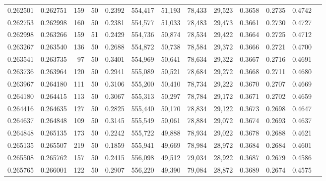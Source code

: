\begin{tabular}{rrrrrrrrrrrrr}
0.262501 & 0.262751 &   159 &  50 &                                     0.2392 & 554,417 &  51,193 &  78,433 &  29,523 & 0.3658 & 0.2735 & 0.4742 \\
0.262753 & 0.262998 &   160 &  50 &                                     0.2381 & 554,577 &  51,033 &  78,483 &  29,473 & 0.3661 & 0.2730 & 0.4727 \\
0.262998 & 0.263266 &   159 &  51 &                                     0.2429 & 554,736 &  50,874 &  78,534 &  29,422 & 0.3664 & 0.2725 & 0.4712 \\
0.263267 & 0.263540 &   136 &  50 &                                     0.2688 & 554,872 &  50,738 &  78,584 &  29,372 & 0.3666 & 0.2721 & 0.4700 \\
0.263541 & 0.263735 &    97 &  50 &                                     0.3401 & 554,969 &  50,641 &  78,634 &  29,322 & 0.3667 & 0.2716 & 0.4691 \\
0.263736 & 0.263964 &   120 &  50 &                                     0.2941 & 555,089 &  50,521 &  78,684 &  29,272 & 0.3668 & 0.2711 & 0.4680 \\
0.263967 & 0.264180 &   111 &  50 &                                     0.3106 & 555,200 &  50,410 &  78,734 &  29,222 & 0.3670 & 0.2707 & 0.4669 \\
0.264180 & 0.264415 &   113 &  50 &                                     0.3067 & 555,313 &  50,297 &  78,784 &  29,172 & 0.3671 & 0.2702 & 0.4659 \\
0.264416 & 0.264635 &   127 &  50 &                                     0.2825 & 555,440 &  50,170 &  78,834 &  29,122 & 0.3673 & 0.2698 & 0.4647 \\
0.264637 & 0.264848 &   109 &  50 &                                     0.3145 & 555,549 &  50,061 &  78,884 &  29,072 & 0.3674 & 0.2693 & 0.4637 \\
0.264848 & 0.265135 &   173 &  50 &                                     0.2242 & 555,722 &  49,888 &  78,934 &  29,022 & 0.3678 & 0.2688 & 0.4621 \\
0.265135 & 0.265507 &   219 &  50 &                                     0.1859 & 555,941 &  49,669 &  78,984 &  28,972 & 0.3684 & 0.2684 & 0.4601 \\
0.265508 & 0.265762 &   157 &  50 &                                     0.2415 & 556,098 &  49,512 &  79,034 &  28,922 & 0.3687 & 0.2679 & 0.4586 \\
0.265765 & 0.266001 &   122 &  50 &                                     0.2907 & 556,220 &  49,390 &  79,084 &  28,872 & 0.3689 & 0.2674 & 0.4575 \\

\end{tabular}
